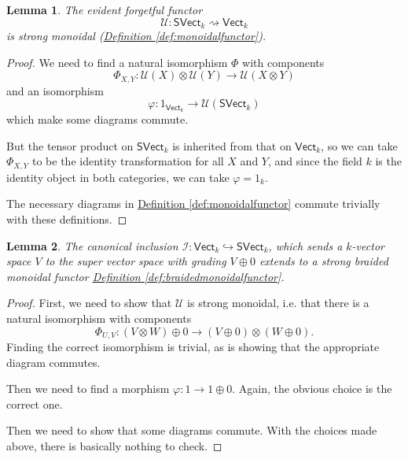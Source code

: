 \documentclass[a4paper,10pt]{scrreprt}
\theoremstyle{definition}
\theoremstyle{plain}
\newtheorem{lemma}{Lemma}[section]
\theoremstyle{remark}
\begin{document}
\begin{lemma}
  The evident forgetful functor 
  \begin{equation*}
    \mathcal{U}\colon \mathsf{SVect}_{k} \rightsquigarrow \mathsf{Vect}_{k}
  \end{equation*}
  is strong monoidal (\hyperref[def:monoidalfunctor]{Definition \ref*{def:monoidalfunctor}}).
\end{lemma}
\begin{proof}
  We need to find a natural isomorphism $\Phi$ with components 
  \begin{equation*}
    \Phi_{X, Y}\colon \mathcal{U}(X) \otimes \mathcal{U}(Y) \to \mathcal{U}(X \otimes Y)
  \end{equation*}
  and an isomorphism
  \begin{equation*}
    \varphi\colon 1_{\mathsf{Vect}_{k}} \to \mathcal{U}(\mathsf{SVect}_{k})
  \end{equation*}
  which make some diagrams commute.

  But the tensor product on $\mathsf{SVect}_{k}$ is inherited from that on $\mathsf{Vect}_{k}$, so we can take $\Phi_{X, Y}$ to be the identity transformation for all $X$ and $Y$, and since the field $k$ is the identity object in both categories, we can take $\varphi = 1_{k}$.

  The necessary diagrams in \hyperref[def:monoidalfunctor]{Definition \ref*{def:monoidalfunctor}} commute trivially with these definitions.
\end{proof} 

\begin{lemma}
  \label{lemma:monoidalinclusionofvectorspacesintosupervectorspaces}
  The canonical inclusion $\mathcal{I}\colon \mathsf{Vect}_{k} \hookrightarrow \mathsf{SVect}_{k}$, which sends a $k$-vector space $V$ to the super vector space with grading $V \oplus 0$ extends to a strong braided monoidal functor \hyperref[def:braidedmonoidalfunctor]{Definition \ref*{def:braidedmonoidalfunctor}}.
\end{lemma}
\begin{proof}
  First, we need to show that $\mathcal{U}$ is strong monoidal, i.e. that there is a natural isomorphism with components
  \begin{equation*}
    \Phi_{U,V}\colon (V \otimes W) \oplus 0 \to (V \oplus 0) \otimes (W \oplus 0).
  \end{equation*}
  Finding the correct isomorphism is trivial, as is showing that the appropriate diagram commutes.

  Then we need to find a morphism $\varphi\colon 1 \to 1 \oplus 0$. Again, the obvious choice is the correct one.

  Then we need to show that some diagrams commute. With the choices made above, there is basically nothing to check.
\end{proof}
\end{document}
